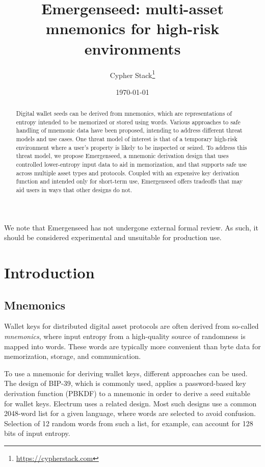 \documentclass{article}
\title{Emergenseed: multi-asset mnemonics for high-risk environments}
\author{Cypher Stack\thanks{\url{https://cypherstack.com}}}
\date{\today}
\begin{document}
\maketitle

\begin{abstract}
	Digital wallet seeds can be derived from mnemonics, which are representations of entropy intended to be memorized or stored using words.
	Various approaches to safe handling of mnemonic data have been proposed, intending to address different threat models and use cases.
	One threat model of interest is that of a temporary high-risk environment where a user's property is likely to be inspected or seized.
	To address this threat model, we propose Emergenseed, a mnemonic derivation design that uses controlled lower-entropy input data to aid in memorization, and that supports safe use across multiple asset types and protocols.
	Coupled with an expensive key derivation function and intended only for short-term use, Emergenseed offers tradeoffs that may aid users in ways that other designs do not.
\end{abstract}

We note that Emergenseed has not undergone external formal review.
As such, it should be considered experimental and unsuitable for production use.


\section{Introduction}

\subsection{Mnemonics}

Wallet keys for distributed digital asset protocols are often derived from so-called \textit{mnemonics}, where input entropy from a high-quality source of randomness is mapped into words.
These words are typically more convenient than byte data for memorization, storage, and communication.

To use a mnemonic for deriving wallet keys, different approaches can be used.
The design of BIP-39, which is commonly used, applies a password-based key derivation function (PBKDF) to a mnemonic in order to derive a seed suitable for wallet keys.
Electrum uses a related design.
Most such designs use a common 2048-word list for a given language, where words are selected to avoid confusion.
Selection of 12 random words from such a list, for example, can account for 128 bits of input entropy.
\end{document}
